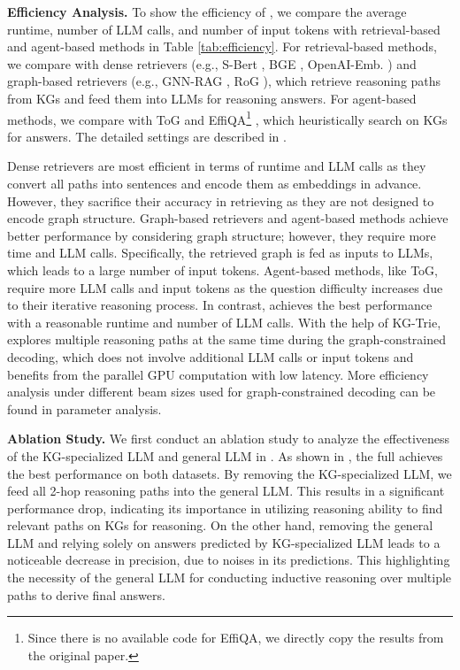 \noindent\textbf{Efficiency Analysis.}
To show the efficiency of \ourmethod, we compare the average runtime, number of LLM calls, and number of input tokens with retrieval-based and agent-based methods in Table \ref{tab:efficiency}. For retrieval-based methods, we compare with dense retrievers (e.g., S-Bert \citep{reimers-2019-sentence-bert}, BGE \citep{llm_embedder}, OpenAI-Emb. \citep{openai-embedding}) and graph-based retrievers (e.g., GNN-RAG \citep{mavromatis2024gnn}, RoG \citep{luo2024rog}), which retrieve reasoning paths from KGs and feed them into LLMs for reasoning answers. For agent-based methods, we compare with ToG \citep{sunthink} and EffiQA\footnote{Since there is no available code for EffiQA, we directly copy the results from the original paper.} \citep{dong2024effiqa}, which heuristically search on KGs for answers. The detailed settings are described in .

Dense retrievers are most efficient in terms of runtime and LLM calls as they convert all paths into sentences and encode them as embeddings in advance. However, they sacrifice their accuracy in retrieving as they are not designed to encode graph structure. Graph-based retrievers and agent-based methods achieve better performance by considering graph structure; however, they require more time and LLM calls. Specifically, the retrieved graph is fed as inputs to LLMs, which leads to a large number of input tokens. Agent-based methods, like ToG, require more LLM calls and input tokens as the question difficulty increases due to their iterative reasoning process. 
In contrast, \ourmethod achieves the best performance with a reasonable runtime and number of LLM calls. With the help of KG-Trie, \ourmethod explores multiple reasoning paths at the same time during the graph-constrained decoding, which does not involve additional LLM calls or input tokens and benefits from the parallel GPU computation with low latency. More efficiency analysis under different beam sizes used for graph-constrained decoding can be found in parameter analysis.

 
\noindent\textbf{Ablation Study.} We first conduct an ablation study to analyze the effectiveness of the KG-specialized LLM and general LLM in \ourmethod. As shown in , the full \ourmethod achieves the best performance on both datasets. By removing the KG-specialized LLM, we feed all 2-hop reasoning paths into the general LLM. This results in a significant performance drop, indicating its importance in utilizing reasoning ability to find relevant paths on KGs for reasoning. On the other hand, removing the general LLM and relying solely on answers predicted by KG-specialized LLM leads to a noticeable decrease in precision, due to noises in its predictions. This highlighting the necessity of the general LLM for conducting inductive reasoning over multiple paths to derive final answers.



